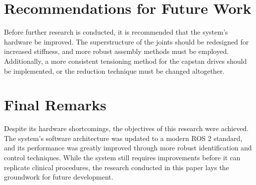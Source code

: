 \section{Recommendations for Future Work}
\label{section:future_work}

Before further research is conducted, it is recommended that the system's hardware be improved. The superstructure of the joints should be redesigned for increased stiffness, and more robust assembly methods must be employed. Additionally, a more consistent tensioning method for the capstan drives should be implemented, or the reduction technique must be changed altogether.

\section{Final Remarks}

Despite its hardware shortcomings, the objectives of this research were achieved. The system's software architecture was updated to a modern ROS 2 standard, and its performance was greatly improved through more robust identification and control techniques. While the system still requires improvements before it can replicate clinical procedures, the research conducted in this paper lays the groundwork for future development.